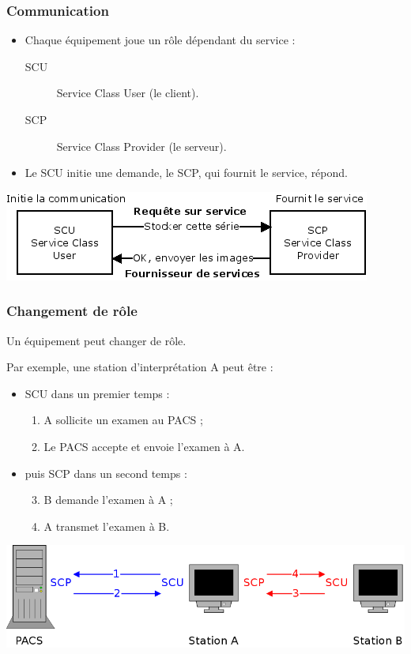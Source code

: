 \frame
{
	\frametitle{Communication}
	\begin{itemize}
		\item Chaque \'equipement joue un r\^ole d\'ependant du service :
		\begin{description}
			\item[SCU] Service Class User (le client).
			\item[SCP] Service Class Provider (le serveur).
		\end{description}
		\item Le SCU initie une demande, le SCP, qui fournit le service, r\'epond.
	\end{itemize}
	
	\begin{center}
		\includegraphics[width=.8\linewidth]{./figures/scu-scp.png}
	\end{center}
}

\frame
{
	\frametitle{Changement de r\^ole}
	Un \'equipement peut changer de r\^ole.
	
	Par exemple, une station d'interpr\'etation A peut \^etre :
	\begin{itemize}
		\item SCU dans un premier temps :
		\begin{enumerate}
			\item A sollicite un examen au PACS ;
			\item Le PACS accepte et envoie l'examen \`a A.
		\end{enumerate}
		\item puis SCP dans un second temps :
		\begin{enumerate}
		\setcounter{enumi}{2}
			\item B demande l'examen \`a A ;
			\item A transmet l'examen \`a B.
		\end{enumerate}
	\end{itemize}
	
	\includegraphics[width=\linewidth]{./figures/roles.png}
}

